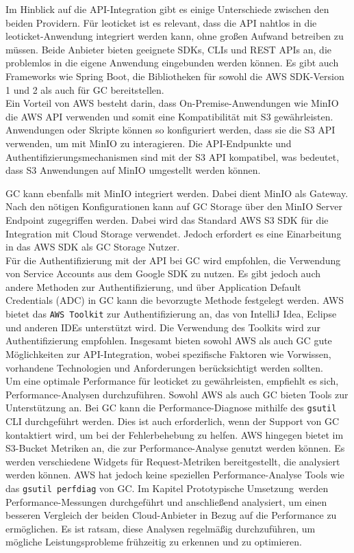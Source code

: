 Im Hinblick auf die API-Integration gibt es einige Unterschiede zwischen den beiden Providern. Für leoticket ist es relevant, dass die API nahtlos in die leoticket-Anwendung integriert werden kann, ohne großen Aufwand betreiben zu müssen. Beide Anbieter bieten geeignete SDKs, CLIs und REST APIs an, die problemlos in die eigene Anwendung eingebunden werden können. Es gibt auch Frameworks wie Spring Boot, die Bibliotheken für sowohl die AWS SDK-Version 1 und 2 als auch für GC bereitstellen.\\ 

Ein Vorteil von AWS besteht darin, dass On-Premise-Anwendungen wie MinIO die AWS API verwenden und somit eine Kompatibilität mit S3 gewährleisten. Anwendungen oder Skripte können so konfiguriert werden, dass sie die S3 API verwenden, um mit MinIO zu interagieren. Die API-Endpunkte und Authentifizierungsmechanismen sind mit der S3 API kompatibel, was bedeutet, dass S3 Anwendungen auf MinIO umgestellt werden können.

\newpage 

GC kann ebenfalls mit MinIO integriert werden. Dabei dient MinIO als Gateway. Nach den nötigen Konfigurationen kann auf GC Storage über den MinIO Server Endpoint zugegriffen werden. Dabei wird das Standard AWS S3 SDK für die Integration mit Cloud Storage verwendet. Jedoch erfordert es eine Einarbeitung in das AWS SDK als GC Storage Nutzer.\\ 

Für die Authentifizierung mit der API bei GC wird empfohlen, die Verwendung von Service Accounts aus dem Google SDK zu nutzen. Es gibt jedoch auch andere Methoden zur Authentifizierung, und über Application Default Credentials (ADC) in GC kann die bevorzugte Methode festgelegt werden. AWS bietet das \verb|AWS Toolkit| zur Authentifizierung an, das von IntelliJ Idea, Eclipse und anderen IDEs unterstützt wird. Die Verwendung des Toolkits wird zur Authentifizierung empfohlen. Insgesamt bieten sowohl AWS als auch GC gute Möglichkeiten zur API-Integration, wobei spezifische Faktoren wie Vorwissen, vorhandene Technologien und Anforderungen berücksichtigt werden sollten.\\

Um eine optimale Performance für leoticket zu gewährleisten, empfiehlt es sich, Performance-Analysen durchzuführen. Sowohl AWS als auch GC bieten Tools zur Unterstützung an. Bei GC kann die Performance-Diagnose mithilfe des \verb|gsutil| CLI durchgeführt werden. Dies ist auch erforderlich, wenn der Support von GC kontaktiert wird, um bei der Fehlerbehebung zu helfen. AWS hingegen bietet im S3-Bucket Metriken an, die zur Performance-Analyse genutzt werden können. Es werden verschiedene Widgets für Request-Metriken bereitgestellt, die analysiert werden können. AWS hat jedoch keine speziellen Performance-Analyse Tools wie das \verb|gsutil perfdiag| von GC. Im Kapitel \glqq Prototypische Umsetzung\grqq\ werden Performance-Messungen durchgeführt und anschließend analysiert, um einen besseren Vergleich der beiden Cloud-Anbieter in Bezug auf die Performance zu ermöglichen. Es ist ratsam, diese Analysen regelmäßig durchzuführen, um mögliche Leistungsprobleme frühzeitig zu erkennen und zu optimieren.\\ 


